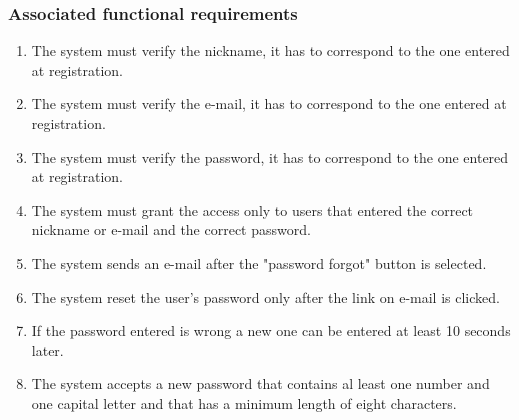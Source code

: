 \subsubsection{Associated functional requirements}
\begin{enumerate}
\item The system must verify the nickname, it has to correspond to the one entered at registration.
\item The system must verify the e-mail, it has to correspond to the one entered at registration.
\item The system must verify the password, it has to correspond to the one entered at registration.
\item The system must grant the access only to users that entered the correct nickname or e-mail and the correct password.
\item The system sends an e-mail after the "password forgot" button is selected.
\item The system reset the user's password only after the link on e-mail is clicked.
\item If the password entered is wrong a new one can be entered at least 10 seconds later.
\item The system accepts a new password that contains al least one number and one capital letter and that has a minimum length of eight characters.
\end{enumerate}